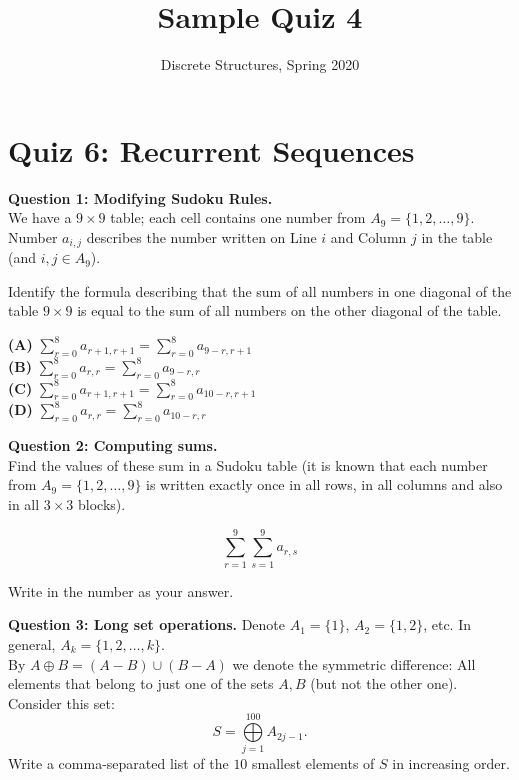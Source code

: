 \documentclass[jou]{apa6}
\title{Sample Quiz 4}
\author{Discrete Structures, Spring 2020}
\affiliation{RBS}
\begin{document}

\twocolumn
\section{Quiz 6: Recurrent Sequences}

\vspace{10pt}
{\bf Question 1: Modifying Sudoku Rules.}\\ 
We have a $9 \times 9$ table; each cell contains one number from 
$A_9 = \{ 1, 2,\ldots, 9 \}$. 
Number $a_{i,j}$ describes the number written on Line $i$ and
Column $j$ in the table (and $i,j \in A_9$). 

Identify the formula describing that the sum of all numbers in one 
diagonal of the table $9 \times 9$ is equal to the sum of all numbers
on the other diagonal of the table.

{\bf (A)} ${\displaystyle \sum\limits_{r=0}^{8} a_{r+1,r+1} = \sum\limits_{r=0}^{8} a_{9-r,r+1}}$\\
{\bf (B)} ${\displaystyle \sum\limits_{r=0}^{8} a_{r,r} = \sum\limits_{r=0}^{8} a_{9-r,r}}$\\
{\bf (C)} ${\displaystyle \sum\limits_{r=0}^{8} a_{r+1,r+1} = \sum\limits_{r=0}^{8} a_{10-r,r+1}}$\\
{\bf (D)} ${\displaystyle \sum\limits_{r=0}^{8} a_{r,r} = \sum\limits_{r=0}^{8} a_{10-r,r}}$

\vspace{6pt}
{\bf Question 2: Computing sums.}\\ 
Find the values of these sum in a Sudoku table (it is known that each number from $A_9 = \{ 1, 2,\ldots, 9 \}$ 
is written exactly once in all rows, in all columns and also in all $3 \times 3$ blocks). 


$${\displaystyle \sum\limits_{r=1}^{9} \sum\limits_{s=1}^{9} a_{r,s}}$$

Write in the number as your answer.




\vspace{6pt}
{\bf Question 3: Long set operations.} Denote $A_1 = \{ 1 \}$, $A_2 = \{ 1,2 \}$, etc. 
In general, $A_k = \{ 1,2,\ldots,k\}$.\\ 
By $A \oplus B = (A - B) \cup (B-A)$
we denote the symmetric difference: All elements that belong to just one of the
sets $A,B$ (but not the other one). 
Consider this set:
$$S = \bigoplus\limits_{j=1}^{100} A_{2j-1}.$$
Write a comma-separated list of the $10$ smallest elements of $S$ in 
increasing order.
\end{document}

